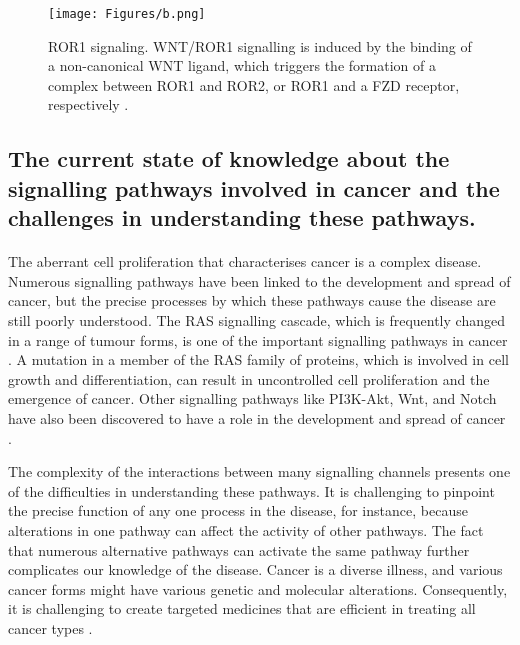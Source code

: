  \begin{figure}[hbt!]
	\centering
	\begin{framed}
	\texttt{[image: Figures/b.png]}
		\end{framed}
	\caption{ROR1 signaling. WNT/ROR1 signalling is induced by the binding of a non-canonical WNT ligand, which triggers the formation of a complex between ROR1 and ROR2, or ROR1 and a FZD receptor, respectively \cite{menck2021wnt}. }
	\label{fig:2}
\end{figure}

\subsection{The current state of knowledge about the signalling pathways involved in cancer and the challenges in understanding these pathways.}
\paragraph{}

The aberrant cell proliferation that characterises cancer is a complex disease. Numerous signalling pathways have been linked to the development and spread of cancer, but the precise processes by which these pathways cause the disease are still poorly understood. The RAS signalling cascade, which is frequently changed in a range of tumour forms, is one of the important signalling pathways in cancer \cite{maruta1994regulation}. A mutation in a member of the RAS family of proteins, which is involved in cell growth and differentiation, can result in uncontrolled cell proliferation and the emergence of cancer. Other signalling pathways like PI3K-Akt, Wnt, and Notch have also been discovered to have a role in the development and spread of cancer \cite{rizzatti2005gene, lombardi2013solar}.

The complexity of the interactions between many signalling channels presents one of the difficulties in understanding these pathways. It is challenging to pinpoint the precise function of any one process in the disease, for instance, because alterations in one pathway can affect the activity of other pathways. The fact that numerous alternative pathways can activate the same pathway further complicates our knowledge of the disease. Cancer is a diverse illness, and various cancer forms might have various genetic and molecular alterations. Consequently, it is challenging to create targeted medicines that are efficient in treating all cancer types \cite{meng2017identification, hansen2015gut}. 

